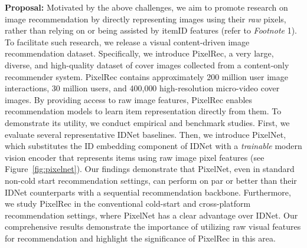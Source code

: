 \documentclass[sigconf]{acmart}
\begin{document}
	
\textbf{Proposal:} Motivated by the above challenges, we aim to promote  research on image recommendation by directly representing images  using their \textit{raw} pixels, rather than relying on or being assisted by itemID features (refer to \textit{Footnote} 1). To facilitate such research, we  release a visual content-driven image recommendation dataset.
Specifically, we introduce PixelRec, a very large, diverse, and high-quality dataset of cover images collected from a content-only recommender system. PixelRec contains approximately 200 million user image interactions, 30 million users, and 400,000 high-resolution micro-video cover images. By providing access to raw image features, PixelRec enables recommendation models to 
learn item representation directly from them.
To demonstrate its utility, we conduct empirical and benchmark studies. First, we evaluate several representative IDNet baselines. Then, 
we introduce PixelNet, which substitutes  the ID embedding component  of IDNet with a \textit{trainable} modern vision encoder that represents items using raw image pixel features (see Figure~\ref{fig:pixelnet}).
  Our findings demonstrate that PixelNet, even in standard non-cold start recommendation settings, can perform on par or better than their IDNet counterparts  with a sequential recommendation backbone.
Furthermore, we study PixelRec in the conventional  cold-start and cross-platform recommendation settings,   where PixelNet has a clear advantage over IDNet. 
	Our comprehensive results demonstrate the importance of utilizing raw visual features for recommendation and highlight the significance of PixelRec in this area.
\end{document}
